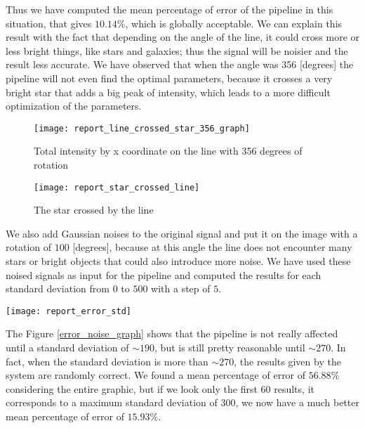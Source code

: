 \documentclass[a4paper,12pt,oneside]{report}
\begin{document}
Thus we have computed the mean percentage of error of the pipeline in this situation, that gives $10.14 \%$, which is globally acceptable. We can 
explain this result with the fact that depending on the angle of the line, it could cross more or less bright things, like stars and galaxies;
thus the signal will be noisier and the result less accurate. We have observed that when the angle was 356 [degrees] the pipeline will not
even find the optimal parameters, because it crosses a very bright star that adds a big peak of intensity, which leads to a more difficult
optimization of the parameters.
\begin{figure}[h]
    \begin{minipage}[c]{.47\linewidth}
        \centering
        \texttt{[image: report\_line\_crossed\_star\_356\_graph]}
        \caption{Total intensity by x coordinate on the line with 356 degrees of rotation}
        \label{graphRotated356Line}
    \end{minipage}
    \hfill
    \begin{minipage}[c]{.47\linewidth}
        \centering
        \texttt{[image: report\_star\_crossed\_line]}
        \caption{The star crossed by the line}
    \end{minipage}
\end{figure}

We also add Gaussian noises to the original signal and put it on the image with a rotation of $100$ [degrees], because at this angle the line
does not encounter many stars or bright objects that could also introduce more noise. We have used these noised signals as input for the pipeline 
and computed the results for each standard deviation from $0$ to $500$ with a step of $5$.
\begin{center}
    \texttt{[image: report\_error\_std]}
    \label{error_noise_graph}
\end{center}
The Figure \ref{error_noise_graph} shows that the pipeline is not really affected until a standard deviation of $\sim 190$, but is still 
pretty reasonable until $\sim 270$. In fact, when the standard deviation is more than $\sim 270$, the results given by the system are 
randomly correct. We found a mean percentage of error of $56.88 \%$ considering the  entire graphic, but if we look only the first $60$ results,
it corresponds to a maximum standard deviation of $300$, we now have a much better mean percentage of error of $15.93 \%$.
\end{document}
